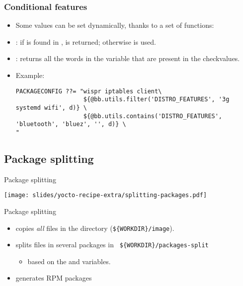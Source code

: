 \begin{frame}[fragile]
  \frametitle{Conditional features}
  \begin{itemize}
    \item Some values can be set dynamically, thanks to a set of
      functions:
    \item {}: if  is found in
      ,  is returned; otherwise
       is used.
    \item {}: returns
      all the words in the variable that are present in the
      checkvalues.
    \item Example:
      \begin{block}{}
      \fontsize{9}{9}\selectfont
      \begin{verbatim}
PACKAGECONFIG ??= "wispr iptables client\
                   ${@bb.utils.filter('DISTRO_FEATURES', '3g systemd wifi', d)} \
                   ${@bb.utils.contains('DISTRO_FEATURES', 'bluetooth', 'bluez', '', d)} \
"
      \end{verbatim}
      \end{block}
  \end{itemize}
\end{frame}

\subsection{Package splitting}

\begin{frame}{Package splitting}
  \begin{center}
    \texttt{[image: slides/yocto-recipe-extra/splitting-packages.pdf]}
  \end{center}
\end{frame}

\begin{frame}{Package splitting}
  \begin{itemize}
    \item {} copies {\em all} files in the  directory
      ({\tt \$\{WORKDIR\}/image}).
    \item {} splits files in several packages in {\tt
      \$\{WORKDIR\}/packages-split}
      \begin{itemize}
        \item based on the \yoctovar{PACKAGES} and \yoctovar{FILES} variables.
      \end{itemize}
    \item {} generates RPM packages
  \end{itemize}
\end{frame}

